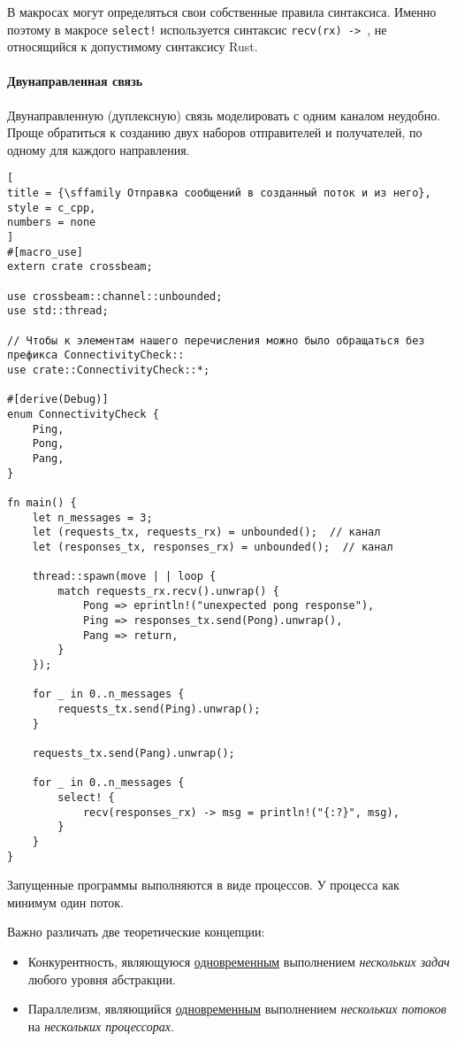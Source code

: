 \documentclass[%
	11pt,
	a4paper,
	utf8,
		]{article}
\begin{document}
В макросах могут определяться свои собственные правила синтаксиса. Именно поэтому в макросе \verb|select!| используется синтаксис \verb|recv(rx) -> |, не относящийся к допустимому синтаксису Rust.

\paragraph{Двунаправленная связь} Двунаправленную (дуплексную) связь моделировать с одним каналом неудобно. Проще обратиться к созданию двух наборов отправителей и получателей, по одному для каждого направления.

\begin{lstlisting}[
title = {\sffamily Отправка сообщений в созданный поток и из него},
style = c_cpp,
numbers = none
]
#[macro_use]
extern crate crossbeam;

use crossbeam::channel::unbounded;
use std::thread;

// Чтобы к элементам нашего перечисления можно было обращаться без префикса ConnectivityCheck::
use crate::ConnectivityCheck::*;

#[derive(Debug)]
enum ConnectivityCheck {
    Ping,
    Pong,
    Pang,
}

fn main() {
    let n_messages = 3;
    let (requests_tx, requests_rx) = unbounded();  // канал
    let (responses_tx, responses_rx) = unbounded();  // канал
    
    thread::spawn(move | | loop {
        match requests_rx.recv().unwrap() {
            Pong => eprintln!("unexpected pong response"),
            Ping => responses_tx.send(Pong).unwrap(),
            Pang => return,
        }
    });

    for _ in 0..n_messages {
        requests_tx.send(Ping).unwrap();
    }

    requests_tx.send(Pang).unwrap();
    
    for _ in 0..n_messages {
        select! {
            recv(responses_rx) -> msg = println!("{:?}", msg),
        }
    }
}
\end{lstlisting}

Запущенные программы выполняются в виде процессов. У процесса как минимум один поток. 

Важно различать две теоретические концепции:
\begin{itemize}
	\item Конкурентность, являющуюся \underline{одновременным} выполнением \emph{нескольких задач} любого уровня абстракции.
	
	\item Параллелизм, являющийся \underline{одновременным} выполнением \emph{нескольких потоков} на \emph{нескольких процессорах}.
\end{itemize}
\end{document}
